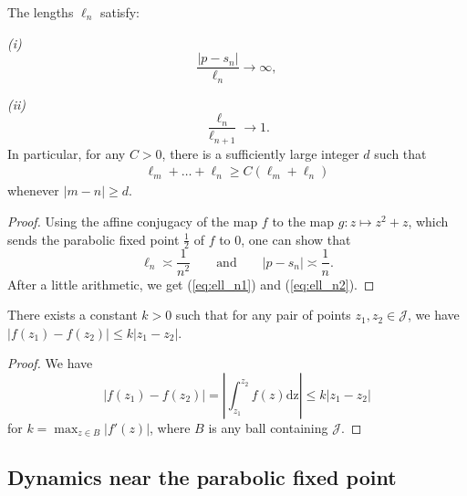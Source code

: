 \begin{lemma} \label{lem-ell_n}
	The lengths ${\ell_n}$ satisfy:
	
	{\em (i)}
	\begin{equation}
	\label{eq:ell_n1}
		\frac {|p-s_n|}{\ell_n} \to \infty,
	\end{equation}
	
	{\em (ii)}
	\begin{equation}
	\label{eq:ell_n2}
		\frac{\ell_n}{\ell_{n+1}} \to 1.
	\end{equation}
	In particular, for any $C > 0$, there is a sufficiently large integer $d$ such that
	\begin{align*}
		\ell_{m}+\ldots+\ell_{n} \geq C (\ell_m+\ell_n)
	\end{align*}
	whenever $|m-n| \geq d$.
\end{lemma}

\begin{proof}
Using the affine conjugacy of the map $f$ to the map $g: z\mapsto z^2+z$, which sends the parabolic fixed point $\frac{1}{2}$ of $f$ to $0$, one can show that
$$
\ell_n \asymp \frac{1}{n^2} \qquad \text{and} \qquad |p - s_n| \asymp \frac{1}{n}.
$$
After a little arithmetic, we get (\ref{eq:ell_n1}) and (\ref{eq:ell_n2}).
\end{proof}


\begin{lemma}
There exists a constant $k>0$ such that for any pair of points $z_1, z_2 \in \mathcal J$, we have 
$|f(z_1)-f(z_2)| \leq k|z_1-z_2|$.
\end{lemma}

\begin{proof}
	We have 
	\begin{equation}
		|f(z_1)-f(z_2)| = \left |\int_{z_1} ^{z_2} f(z)\mathrm{dz} \right | \leq k|z_1-z_2|	
	\end{equation}
for $k=\max_{z \in B} |f'(z)|$, where $B$ is any ball containing $\mathcal J$. 
\end{proof}
 
\subsection{Dynamics near the parabolic fixed point}

